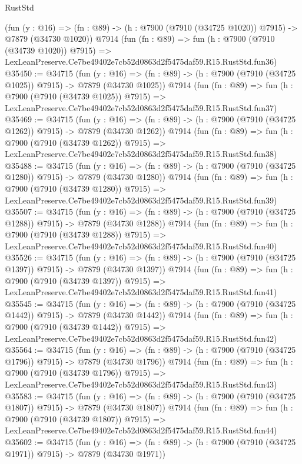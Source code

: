 \begin{lexlean}{RustStd}
\begin{coremodule}
    (fun (y : @16) =>
    (fn : @89) -> (h : @7900 (@7910 (@34725 @1020)) @7915) -> @7879 (@34730 @1020))
    @7914
    (fun (fn : @89) =>
    fun (h : @7900 (@7910 (@34739 @1020)) @7915) =>
    LexLeanPreserve.Ce7be49402e7cb52d0863d2f5475daf59.R15.RustStd.fun36)
@35450 := @34715
    (fun (y : @16) =>
    (fn : @89) -> (h : @7900 (@7910 (@34725 @1025)) @7915) -> @7879 (@34730 @1025))
    @7914
    (fun (fn : @89) =>
    fun (h : @7900 (@7910 (@34739 @1025)) @7915) =>
    LexLeanPreserve.Ce7be49402e7cb52d0863d2f5475daf59.R15.RustStd.fun37)
@35469 := @34715
    (fun (y : @16) =>
    (fn : @89) -> (h : @7900 (@7910 (@34725 @1262)) @7915) -> @7879 (@34730 @1262))
    @7914
    (fun (fn : @89) =>
    fun (h : @7900 (@7910 (@34739 @1262)) @7915) =>
    LexLeanPreserve.Ce7be49402e7cb52d0863d2f5475daf59.R15.RustStd.fun38)
@35488 := @34715
    (fun (y : @16) =>
    (fn : @89) -> (h : @7900 (@7910 (@34725 @1280)) @7915) -> @7879 (@34730 @1280))
    @7914
    (fun (fn : @89) =>
    fun (h : @7900 (@7910 (@34739 @1280)) @7915) =>
    LexLeanPreserve.Ce7be49402e7cb52d0863d2f5475daf59.R15.RustStd.fun39)
@35507 := @34715
    (fun (y : @16) =>
    (fn : @89) -> (h : @7900 (@7910 (@34725 @1288)) @7915) -> @7879 (@34730 @1288))
    @7914
    (fun (fn : @89) =>
    fun (h : @7900 (@7910 (@34739 @1288)) @7915) =>
    LexLeanPreserve.Ce7be49402e7cb52d0863d2f5475daf59.R15.RustStd.fun40)
@35526 := @34715
    (fun (y : @16) =>
    (fn : @89) -> (h : @7900 (@7910 (@34725 @1397)) @7915) -> @7879 (@34730 @1397))
    @7914
    (fun (fn : @89) =>
    fun (h : @7900 (@7910 (@34739 @1397)) @7915) =>
    LexLeanPreserve.Ce7be49402e7cb52d0863d2f5475daf59.R15.RustStd.fun41)
@35545 := @34715
    (fun (y : @16) =>
    (fn : @89) -> (h : @7900 (@7910 (@34725 @1442)) @7915) -> @7879 (@34730 @1442))
    @7914
    (fun (fn : @89) =>
    fun (h : @7900 (@7910 (@34739 @1442)) @7915) =>
    LexLeanPreserve.Ce7be49402e7cb52d0863d2f5475daf59.R15.RustStd.fun42)
@35564 := @34715
    (fun (y : @16) =>
    (fn : @89) -> (h : @7900 (@7910 (@34725 @1796)) @7915) -> @7879 (@34730 @1796))
    @7914
    (fun (fn : @89) =>
    fun (h : @7900 (@7910 (@34739 @1796)) @7915) =>
    LexLeanPreserve.Ce7be49402e7cb52d0863d2f5475daf59.R15.RustStd.fun43)
@35583 := @34715
    (fun (y : @16) =>
    (fn : @89) -> (h : @7900 (@7910 (@34725 @1807)) @7915) -> @7879 (@34730 @1807))
    @7914
    (fun (fn : @89) =>
    fun (h : @7900 (@7910 (@34739 @1807)) @7915) =>
    LexLeanPreserve.Ce7be49402e7cb52d0863d2f5475daf59.R15.RustStd.fun44)
@35602 := @34715
    (fun (y : @16) =>
    (fn : @89) -> (h : @7900 (@7910 (@34725 @1971)) @7915) -> @7879 (@34730 @1971))

\end{coremodule}
\end{lexlean}
